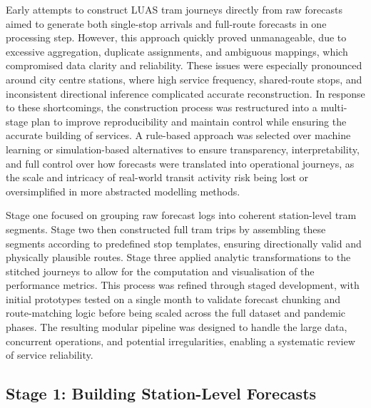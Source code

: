     Early attempts to construct LUAS tram journeys directly from raw forecasts aimed to generate both single-stop arrivals and full-route forecasts in one processing step. However, this approach quickly proved unmanageable, due to excessive aggregation, duplicate assignments, and ambiguous mappings, which compromised data clarity and reliability. These issues were especially pronounced around city centre stations, where high service frequency, shared-route stops, and inconsistent directional inference complicated accurate reconstruction. In response to these shortcomings, the construction process was restructured into a multi-stage plan to improve reproducibility and maintain control while ensuring the accurate building of services. A rule-based approach was selected over machine learning or simulation-based alternatives to ensure transparency, interpretability, and full control over how forecasts were translated into operational journeys, as the scale and intricacy of real-world transit activity risk being lost or oversimplified in more abstracted modelling methods.

    Stage one focused on grouping raw forecast logs into coherent station-level tram segments. Stage two then constructed full tram trips by assembling these segments according to predefined stop templates, ensuring directionally valid and physically plausible routes. Stage three applied analytic transformations to the stitched journeys to allow for the computation and visualisation of the performance metrics. This process was refined through staged development, with initial prototypes tested on a single month to validate forecast chunking and route-matching logic before being scaled across the full dataset and pandemic phases. The resulting modular pipeline was designed to handle the large data, concurrent operations, and potential irregularities, enabling a systematic review of service reliability.



\subsection*{Stage 1: Building Station-Level Forecasts}


